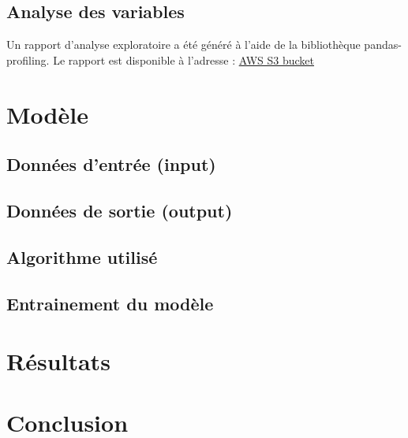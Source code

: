\subsection{Analyse des variables}
Un rapport d'analyse exploratoire a été généré à l'aide de la bibliothèque pandas-profiling.
Le rapport est disponible à l'adresse :
\href{https://tgrandjean-oc-reports.s3.eu-west-3.amazonaws.com/seattle-energy/profiling_report.html}{AWS S3 bucket}

\section{Modèle}

\subsection{Données d'entrée (input)}

\subsection{Données de sortie (output)}

\subsection{Algorithme utilisé}

\subsection{Entrainement du modèle}



\section{Résultats}



\section{Conclusion}


